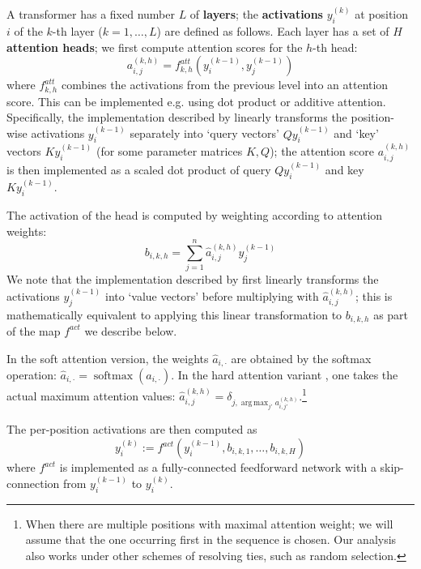\documentclass[11pt,a4paper]{article}
\DeclareMathOperator*{\argmax}{arg\,max}
\newcommand{\key}[1]{\textbf{#1}}
\begin{document}
A transformer has a fixed number $L$ of \key{layers}; the \key{activations} $y_i^{(k)}$ at position $i$ of the $k$-th layer ($k=1, \dots, L$) are defined as follows.
Each layer has a set of $H$ \key{attention heads}; we first compute attention scores for the $h$-th head:
\begin{equation}
    a_{i,j}^{(k,h)} = f^{att}_{k,h}\left(y_i^{(k-1)}, y_j^{(k-1)}\right)
\end{equation}
where $f^{att}_{k,h}$ combines the activations from the previous level into an attention score.
This can be implemented e.g. using dot product or additive attention.
Specifically, the implementation described by \citet{vaswani2017attention} linearly transforms the position-wise activations $y_i^{(k-1)}$ separately into `query vectors' $Q y_i^{(k-1)}$ and `key' vectors $K y_i^{(k-1)}$ (for some parameter matrices $K, Q$); %
the attention score $a_{i,j}^{(k,h)}$ is then implemented as a scaled dot product of query $Q y_i^{(k-1)}$ and key $K y_i^{(k-1)}$.


The  activation of the head is computed by weighting according to attention weights:
\begin{equation}
    b_{i,k,h} = \sum_{j=1}^n \hat{a}_{i,j}^{(k,h)} y_j^{(k-1)} %
\end{equation}
We note that the implementation described by \citet{vaswani2017attention} first linearly transforms the activations $y_j^{(k-1)}$ into `value vectors' before multiplying with $ \hat{a}_{i,j}^{(k,h)}$; this is mathematically equivalent to applying this linear transformation to $b_{i,k,h}$ as part of the map $f^{act}$ we describe below.

In the soft attention version, the weights $\hat{a}_{i,\cdot}$ are obtained by the softmax operation: $\hat{a}_{i,\cdot} = \operatorname{softmax}(a_{i,\cdot})$.
In the hard attention variant \cite{perez2019turing}, one takes the actual maximum attention values:
$\hat{a}_{i,j}^{(k,h)} = \delta_{j, \argmax_{j'} a_{i,j'}^{(k,h)}}$.\footnote{When there are multiple positions with maximal attention weight; we will assume that the one occurring first in the sequence is chosen. Our analysis also works under other schemes of resolving ties, such as random selection.}

The  per-position activations are then computed as
\begin{equation}
    y_i^{(k)} := f^{act}(y_i^{(k-1)}, b_{i,k,1}, \dots, b_{i,k,H})
\end{equation}
where $f^{act}$ is implemented as a fully-connected feedforward network with a skip-connection \cite{vaswani2017attention} from $y_i^{(k-1)}$ to $y_i^{(k)}$.
\end{document}
